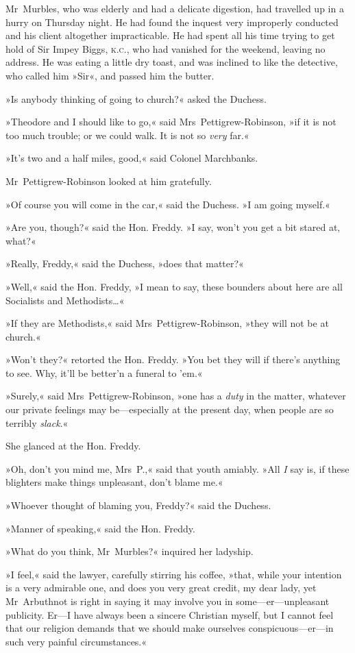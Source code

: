 Mr~Murbles, who was elderly and had a delicate digestion, had travelled up in a hurry on Thursday night. He had found the inquest very improperly conducted and his client altogether impracticable. He had spent all his time trying to get hold of Sir Impey Biggs, \textsc{k.c.}, who had vanished for the weekend, leaving no address. He was eating a little dry toast, and was inclined to like the detective, who called him »Sir«, and passed him the butter.

»Is anybody thinking of going to church?« asked the Duchess.

»Theodore and I should like to go,« said Mrs~Pettigrew-Robinson, »if it is not too much trouble; or we could walk. It is not so \textit{very} far.«

»It's two and a half miles, good,« said Colonel Marchbanks.

Mr~Pettigrew-Robinson looked at him gratefully.

»Of course you will come in the car,« said the Duchess. »I am going myself.«

»Are you, though?« said the Hon. Freddy. »I say, won't you get a bit stared at, what?«

»Really, Freddy,« said the Duchess, »does that matter?«

»Well,« said the Hon. Freddy, »I mean to say, these bounders about here are all Socialists and Methodists\dots«

»If they are Methodists,« said Mrs~Pettigrew-Robinson, »they will not be at church.«

»Won't they?« retorted the Hon. Freddy. »You bet they will if there's anything to see. Why, it'll be better'n a funeral to 'em.«

»Surely,« said Mrs~Pettigrew-Robinson, »one has a \textit{duty} in the matter, whatever our private feelings may be—especially at the present day, when people are so terribly \textit{slack}.«

She glanced at the Hon. Freddy.

»Oh, don't you mind me, Mrs~P\@.,« said that youth amiably. »All \textit{I} say is, if these blighters make things unpleasant, don't blame me.«

»Whoever thought of blaming you, Freddy?« said the Duchess.

»Manner of speaking,« said the Hon. Freddy.

»What do you think, Mr~Murbles?« inquired her ladyship.

»I feel,« said the lawyer, carefully stirring his coffee, »that, while your intention is a very admirable one, and does you very great credit, my dear lady, yet Mr~Arbuthnot is right in saying it may involve you in some—er—unpleasant publicity. Er—I have always been a sincere Christian myself, but I cannot feel that our religion demands that we should make ourselves conspicuous—er—in such very painful circumstances.«

